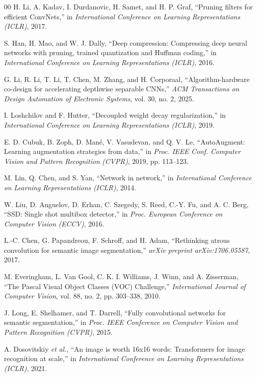 \documentclass[conference]{IEEEtran}
\begin{document}
\begin{thebibliography}{00}
H. Li, A. Kadav, I. Durdanovic, H. Samet, and H. P. Graf, ``Pruning filters for efficient
ConvNets,'' in \textit{International Conference on Learning Representations (ICLR)}, 2017.

S. Han, H. Mao, and W. J. Dally, ``Deep compression: Compressing deep neural networks with
pruning, trained quantization and Huffman coding,'' in \textit{International Conference on
Learning Representations (ICLR)}, 2016.

G. Li, R. Li, T. Li, T. Chen, M. Zhang, and H. Corporaal, ``Algorithm-hardware co-design for
accelerating depthwise separable CNNs,'' \textit{ACM Transactions on Design Automation of
Electronic Systems}, vol. 30, no. 2, 2025.

I. Loshchilov and F. Hutter, ``Decoupled weight decay regularization,'' in \textit{International
Conference on Learning Representations (ICLR)}, 2019.

E. D. Cubuk, B. Zoph, D. Mané, V. Vasudevan, and Q. V. Le, ``AutoAugment: Learning augmentation
strategies from data,'' in \textit{Proc. IEEE Conf. Computer Vision and Pattern Recognition
(CVPR)}, 2019, pp. 113--123.

M. Lin, Q. Chen, and S. Yan, ``Network in network,'' in \textit{International Conference on
Learning Representations (ICLR)}, 2014.

W. Liu, D. Anguelov, D. Erhan, C. Szegedy, S. Reed, C.-Y. Fu, and A. C. Berg, ``SSD: Single shot
multibox detector,'' in \textit{Proc. European Conference on Computer Vision (ECCV)}, 2016.

L.-C. Chen, G. Papandreou, F. Schroff, and H. Adam, ``Rethinking atrous convolution for semantic
image segmentation,'' \textit{arXiv preprint arXiv:1706.05587}, 2017.

M. Everingham, L. Van Gool, C. K. I. Williams, J. Winn, and A. Zisserman, ``The Pascal Visual
Object Classes (VOC) Challenge,'' \textit{International Journal of Computer Vision}, vol. 88,
no. 2, pp. 303--338, 2010.

J. Long, E. Shelhamer, and T. Darrell, ``Fully convolutional networks for semantic segmentation,''
in \textit{Proc. IEEE Conference on Computer Vision and Pattern Recognition (CVPR)}, 2015.

A. Dosovitskiy \textit{et al.}, ``An image is worth 16x16 words: Transformers for image
recognition at scale,'' in \textit{International Conference on Learning Representations (ICLR)},
2021.


\end{thebibliography}
\end{document}
